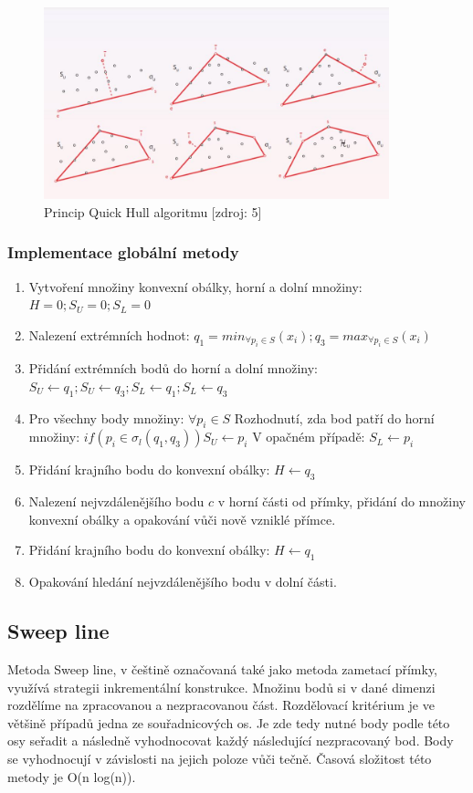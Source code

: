 \documentclass[a4paper, 12pt]{article}
\begin{document}
\begin{figure}[h!]
	\centering
	\includegraphics[width=10cm]{quickhull.jpg}
	\caption{Princip Quick Hull algoritmu [zdroj: 5]}
\end{figure}

\subsubsection{Implementace globální metody}
\begin{enumerate}
\item Vytvoření množiny konvexní obálky, horní a dolní množiny:  $H = 0; S_U = 0; S_L = 0 $ 
\item Nalezení extrémních hodnot:  $ q_1 =  min_{\forall p_i \in S}(x_i); q_3 =  max_{\forall p_i \in S}(x_i) $ 
\item Přidání extrémních bodů do horní a dolní množiny: $S_U \leftarrow q_1; S_U \leftarrow q_3; S_L \leftarrow q_1; S_L \leftarrow q_3 $
\item Pro všechny body množiny: $\forall p_i \in S  $
\subitem Rozhodnutí, zda bod patří do horní množiny: $ if(p_i \in \sigma_l(q_1, q_3)) S_U \leftarrow p_i  $
\subitem V opačném případě: $ S_L \leftarrow p_i  $
\item Přidání krajního bodu do konvexní obálky: $H \leftarrow q_3$
\item Nalezení nejvzdálenějšího bodu $c$ v horní části od přímky, přidání do množiny konvexní obálky a opakování vůči nově vzniklé přímce.
\item Přidání krajního bodu do konvexní obálky: $H \leftarrow q_1$
\item Opakování hledání nejvzdálenějšího bodu v dolní části.
\end{enumerate}



\subsection{Sweep line}
Metoda Sweep line, v češtině označovaná také jako metoda zametací přímky, využívá strategii inkrementální konstrukce. Množinu bodů si v dané dimenzi rozdělíme na zpracovanou a nezpracovanou část. Rozdělovací kritérium je ve většině případů jedna ze souřadnicových os. Je zde tedy nutné body podle této osy seřadit a následně vyhodnocovat každý následující nezpracovaný bod. Body se vyhodnocují v závislosti na jejich poloze vůči tečně. Časová složitost této metody je O(n log(n)). 
\end{document}
